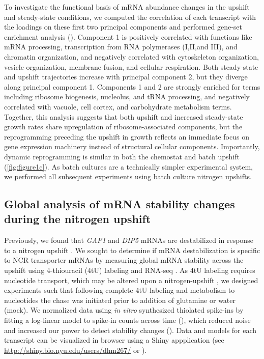 To investigate the functional basis of mRNA abundance changes
in the upshift and steady-state conditions, we computed the
correlation of each transcript with the loadings on these first two
principal components and performed gene-set enrichment analysis
(). 
Component 1 is positively correlated with functions like
mRNA processing, transcription from RNA polymerases (I,II,and III),
and chromatin organization, and negatively correlated with
cytoskeleton organization,
vesicle organization, membrane fusion, and cellular respiration.
Both steady-state and upshift 
trajectories increase with principal component 2, but they diverge
along principal component 1. Components 1 and 2 are 
strongly enriched for terms including ribosome biogenesis, 
nucleolus, and
tRNA processing, and negatively correlated with
vacuole, cell cortex, and carbohydrate metabolism terms. 
Together, this analysis suggests that both upshift and
increased steady-state growth rates share upregulation of
ribosome-associated components, but the reprogramming
preceding the upshift in growth reflects an immediate focus on 
gene expression machinery instead of structural cellular components.
Importantly,
dynamic reprogramming is similar in both the chemostat and batch
upshift (\autoref{fig:figure1c}). As batch cultures are a technically
simpler experimental system, we performed all subsequent experiments
using batch culture nitrogen upshifts. 

\label{subsection:pcaGoCorr}

\subsection{Global analysis of mRNA stability changes during the
nitrogen upshift}

Previously, we found that \textit{GAP1} and \textit{DIP5} mRNAs 
are destabilized in
response to a nitrogen upshift \parencite{airoldi2016steady}. We sought to
determine if mRNA destabilization is specific to NCR transporter
mRNAs by measuring global mRNA stability across the upshift
using 4-thiouracil (4tU) labeling and RNA-seq 
\parencite{neymotin2014determination,munchel2011dynamic}.
As 4tU labeling requires nucleotide transport, which may be altered
upon a nitrogen-upshift \parencite{hein1995npi1}, we designed experiments such
that following complete 4tU labeling and metabolism to nucleotides 
the chase was initiated prior to addition of glutamine or water (mock).
We normalized data using \textit{in vitro} synthesized thiolated 
spike-ins by fitting a log-linear model to spike-in counts
across time (), which reduced noise and increased
our power to detect stability changes ().
Data and models for each transcript can be visualized in browser
using a Shiny appplication (see
\url{http://shiny.bio.nyu.edu/users/dhm267/} or  ). 

